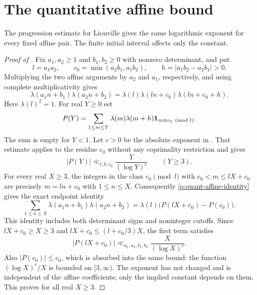 \section{The quantitative affine bound}\label{q:affine-transfer}

The progression estimate for Liouville gives the same logarithmic
exponent for every fixed affine pair. The finite initial interval
affects only the constant.

\begin{proof}[Proof of ]
Fix $a_1,a_2\ge1$ and $b_1,b_2\ge0$ with nonzero determinant, and
put
\[
 l=a_1a_2,\qquad c_0=\min(a_2b_1,a_1b_2),\qquad
 h=|a_1b_2-a_2b_1|>0.
\]
Multiplying the two affine arguments by $a_2$ and $a_1$, respectively,
and using complete multiplicativity gives
\begin{equation}\label{q:quant-affine-identity}
 \lambda(a_1n+b_1)\lambda(a_2n+b_2)
 =\lambda(l)\lambda(ln+c_0)\lambda(ln+c_0+h).
\end{equation}
Here $\lambda(l)^2=1$. For real $Y\ge0$ set
\[
 P(Y)=\sum_{1\le m\le Y}
       \lambda(m)\lambda(m+h)\mathbf 1_{m\equiv c_0\pmod l}.
\]
The sum is empty for $Y<1$. Let $c>0$ be the absolute exponent in
. That estimate applies to the residue $c_0$
without any coprimality restriction and gives
\[
 |P(Y)|\ll_{l,h,c_0}\frac{Y}{(\log Y)^c}\qquad(Y\ge3).
\]
For every real $X\ge3$, the integers in the class $c_0\pmod l$
with $c_0<m\le lX+c_0$ are precisely $m=ln+c_0$ with
$1\le n\le X$. Consequently \eqref{q:quant-affine-identity}
gives the exact endpoint identity
\begin{equation}\label{q:affine-rate-endpoints}
 \sum_{1\le n\le X}\lambda(a_1n+b_1)\lambda(a_2n+b_2)
   =\lambda(l)\bigl(P(lX+c_0)-P(c_0)\bigr).
\end{equation}
This identity includes both determinant signs and noninteger cutoffs.
Since $lX+c_0\ge X\ge3$ and
$lX+c_0\le(l+c_0/3)X$, the first term satisfies
\[
 |P(lX+c_0)|
 \ll_{a_1,a_2,b_1,b_2}\frac{X}{(\log X)^c}.
\]
Also $|P(c_0)|\le c_0$, which is absorbed into the same bound:
the function $(\log X)^c/X$ is bounded on $[3,\infty)$.
The exponent has not changed and is independent of the affine
coefficients; only the implied constant depends on them. This proves
 for all real $X\ge3$.
\end{proof}
